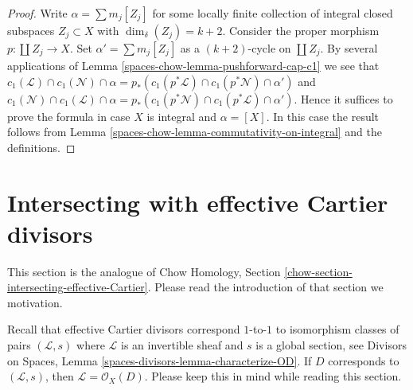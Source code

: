 \begin{proof}
Write $\alpha = \sum m_j[Z_j]$ for some locally finite
collection of integral closed subspaces $Z_j \subset X$
with $\dim_\delta(Z_j) = k + 2$.
Consider the proper morphism $p : \coprod Z_j \to X$.
Set $\alpha' = \sum m_j[Z_j]$ as a $(k + 2)$-cycle on
$\coprod Z_j$. By several applications of
Lemma \ref{spaces-chow-lemma-pushforward-cap-c1} we see that
$c_1(\mathcal{L}) \cap c_1(\mathcal{N}) \cap \alpha
= p_*(c_1(p^*\mathcal{L}) \cap c_1(p^*\mathcal{N}) \cap \alpha')$
and
$c_1(\mathcal{N}) \cap c_1(\mathcal{L}) \cap \alpha
= p_*(c_1(p^*\mathcal{N}) \cap c_1(p^*\mathcal{L}) \cap \alpha')$.
Hence it suffices to prove the formula in case $X$ is integral
and $\alpha = [X]$. In this case the result follows
from Lemma \ref{spaces-chow-lemma-commutativity-on-integral} and the definitions.
\end{proof}

\section{Intersecting with effective Cartier divisors}
\label{spaces-chow-section-intersecting-effective-Cartier}
This section is the analogue of
Chow Homology, Section \ref{chow-section-intersecting-effective-Cartier}.
Please read the introduction of that section we motivation.

\medskip\noindent
Recall that effective Cartier divisors correspond $1$-to-$1$ to
isomorphism classes of pairs $(\mathcal{L}, s)$ where $\mathcal{L}$
is an invertible sheaf and $s$ is a global section, see
Divisors on Spaces, Lemma \ref{spaces-divisors-lemma-characterize-OD}.
If $D$ corresponds to $(\mathcal{L}, s)$, then
$\mathcal{L} = \mathcal{O}_X(D)$. Please keep this in mind while
reading this section.

